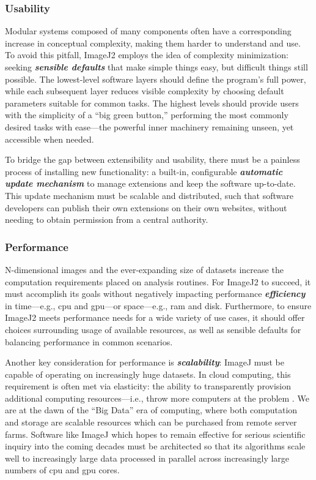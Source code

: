 \documentclass{bmcart}
\begin{document}
\subsubsection*{Usability}
Modular systems composed of many components often have a corresponding increase
in conceptual complexity, making them harder to understand and use. To avoid
this pitfall, ImageJ2 employs the idea of complexity minimization: seeking
\textbf{\textit{sensible defaults}} that make simple things easy, but difficult
things still possible. The lowest-level software layers should define the
program's full power, while each subsequent layer reduces visible complexity by
choosing default parameters suitable for common tasks. The highest levels
should provide users with the simplicity of a ``big green button,'' performing
the most commonly desired tasks with ease---the powerful inner machinery
remaining unseen, yet accessible when needed.

To bridge the gap between extensibility and usability, there must be a painless
process of installing new functionality: a built-in, configurable
\textbf{\textit{automatic update mechanism}} to manage extensions and keep the
software up-to-date. This update mechanism must be scalable and distributed,
such that software developers can publish their own extensions on their own
websites, without needing to obtain permission from a central authority.

\subsubsection*{Performance}
N-dimensional images and the ever-expanding size of datasets increase the
computation requirements placed on analysis routines. For ImageJ2 to succeed,
it must accomplish its goals without negatively impacting performance
\textbf{\textit{efficiency}} in time---e.g., \acrfull{cpu} and
\acrfull{gpu}---or space---e.g., \acrfull{ram} and disk. Furthermore, to ensure
ImageJ2 meets performance needs for a wide variety of use cases, it should
offer choices surrounding usage of available resources, as well as sensible
defaults for balancing performance in common scenarios.

Another key consideration for performance is \textbf{\textit{scalability}}:
ImageJ must be capable of operating on increasingly huge datasets. In cloud
computing, this requirement is often met via elasticity: the ability to
transparently provision additional computing resources---i.e., throw more
computers at the problem \cite{hardware_is_cheap}. We are at the dawn of the
``Big Data'' era of computing, where both computation and storage are scalable
resources which can be purchased from remote server farms. Software like ImageJ
which hopes to remain effective for serious scientific inquiry into the coming
decades must be architected so that its algorithms scale well to increasingly
large data processed in parallel across increasingly large numbers of
\acrshort{cpu} and \acrshort{gpu} cores.
\end{document}
